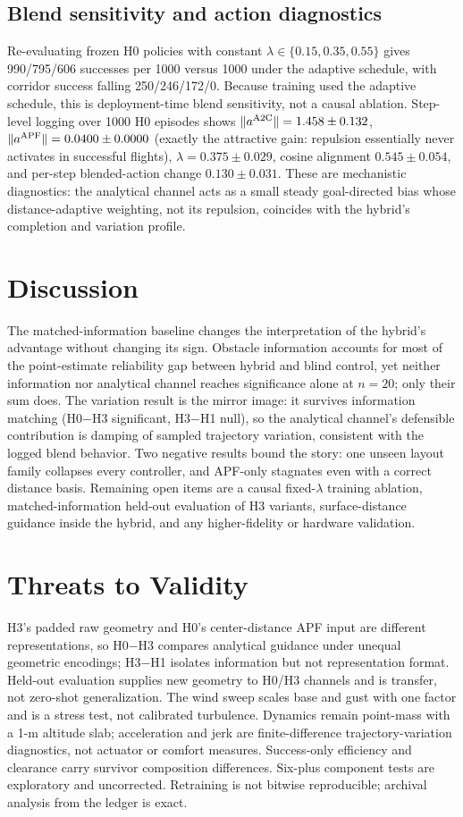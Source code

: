 \documentclass[conference]{IEEEtran}
\begin{document}
\subsection{Blend sensitivity and action diagnostics}
Re-evaluating frozen H0 policies with constant $\lambda\in\{0.15,0.35,0.55\}$ gives 990/795/606 successes per
1000 versus 1000 under the adaptive schedule, with corridor success falling 250/246/172/0. Because training used
the adaptive schedule, this is deployment-time blend sensitivity, not a causal ablation. Step-level logging over
1000 H0 episodes shows $\|a^{\rm A2C}\|=1.458\pm0.132$, $\|a^{\rm APF}\|=0.0400\pm0.0000$ (exactly the attractive
gain: repulsion essentially never activates in successful flights), $\lambda=0.375\pm0.029$, cosine alignment
$0.545\pm0.054$, and per-step blended-action change $0.130\pm0.031$. These are mechanistic diagnostics: the
analytical channel acts as a small steady goal-directed bias whose distance-adaptive weighting, not its
repulsion, coincides with the hybrid's completion and variation profile.

\section{Discussion}
The matched-information baseline changes the interpretation of the hybrid's advantage without changing its sign.
Obstacle information accounts for most of the point-estimate reliability gap between hybrid and blind control,
yet neither information nor analytical channel reaches significance alone at $n=20$; only their sum does. The
variation result is the mirror image: it survives information matching (H0$-$H3 significant, H3$-$H1 null), so
the analytical channel's defensible contribution is damping of sampled trajectory variation, consistent with the
logged blend behavior. Two negative results bound the story: one unseen layout family collapses every
controller, and APF-only stagnates even with a correct distance basis. Remaining open items are a causal
fixed-$\lambda$ training ablation, matched-information held-out evaluation of H3 variants, surface-distance
guidance inside the hybrid, and any higher-fidelity or hardware validation.

\section{Threats to Validity}
H3's padded raw geometry and H0's center-distance APF input are different representations, so H0$-$H3 compares
analytical guidance under unequal geometric encodings; H3$-$H1 isolates information but not representation format.
Held-out evaluation supplies new geometry to H0/H3 channels and is transfer, not zero-shot generalization.
The wind sweep scales base and gust with one factor and is a stress test, not calibrated turbulence. Dynamics
remain point-mass with a 1-m altitude slab; acceleration and jerk are finite-difference trajectory-variation
diagnostics, not actuator or comfort measures. Success-only efficiency and clearance carry survivor composition
differences. Six-plus component tests are exploratory and uncorrected. Retraining is not bitwise reproducible;
archival analysis from the ledger is exact.
\end{document}
